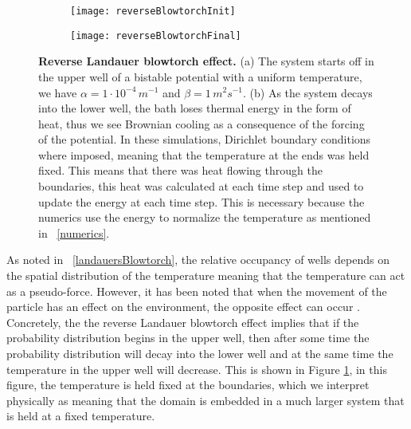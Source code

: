 \begin{figure}
	\begin{subfigure}{0.49\textwidth}
		\texttt{[image: reverseBlowtorchInit]}
	\end{subfigure}
	\begin{subfigure}{0.49\textwidth}
		\texttt{[image: reverseBlowtorchFinal]}
	\end{subfigure}
	\caption{\textbf{Reverse Landauer blowtorch effect.} (a) The system starts off in the upper well of a bistable potential with a uniform temperature, we have $\alpha = 1 \cdot 10^{-4} \, m^{-1}$ and $\beta = 1  \, m^2 s^{-1}$. (b) As the system decays into the lower well, the bath loses thermal energy in the form of heat, thus we see Brownian cooling as a consequence of the forcing of the potential. In these simulations, Dirichlet boundary conditions where imposed, meaning that the temperature at the ends was held fixed. This means that there was heat flowing through the boundaries, this heat was calculated at each time step and used to update the energy at each time step. This is necessary because the numerics use the energy to normalize the temperature as mentioned in ~\autoref{numerics}. \label{fig:reverseBlowtorch}}
\end{figure}
As noted in ~\autoref{landauersBlowtorch}, the relative occupancy of wells depends on the spatial distribution of the temperature meaning that the temperature can act as a pseudo-force. However, it has been noted that when the movement of the particle has an effect on the environment, the opposite effect can occur \cite{DasDasBarikEtAl2015}. Concretely, the the reverse Landauer blowtorch effect implies that if the probability distribution begins in the upper well, then after some time the probability distribution will decay into the lower well and at the same time the temperature in the upper well will decrease. This is shown in Figure \ref{fig:reverseBlowtorch}, in this figure, the temperature is held fixed at the boundaries, which we interpret physically as meaning that the domain is embedded in a much larger system that is held at a fixed temperature.


